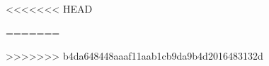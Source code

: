 \documentclass[12pt, a4paper, oneside]{memoir}
\begin{document}

<<<<<<< HEAD
	
	
=======
%	
%	
%	
%	
%	
%	
%	
%	
%	
%	
%	
%	
%	
    
%    
%	
%	
%	
%	
%	
%	
>>>>>>> b4da648448aaaf11aab1cb9da9b4d2016483132d

\end{document}
